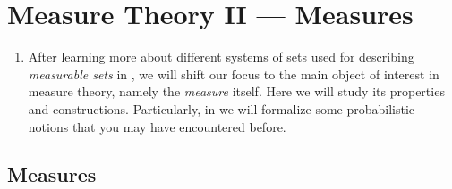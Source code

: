 \section{Measure Theory II --- Measures}
\label{sect:measures}
\begin{enumerate}
\item After learning more about different systems of sets used for describing
\emph{measurable sets} in , we will shift our
focus to the main object of interest in measure theory, namely the
\emph{measure} itself. Here we will study its properties and constructions.
Particularly, in  we will formalize some probabilistic
notions that you may have encountered before.
\end{enumerate}
\subsection{Measures}
